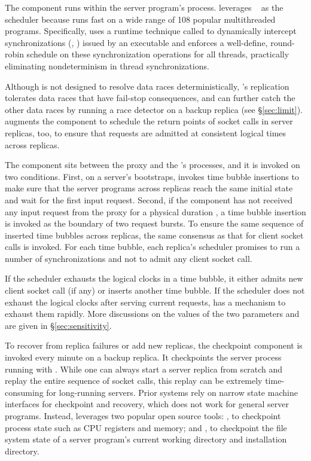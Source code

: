 The \dmt component runs within the server program's process. \xxx leverages 
\parrot~\cite{parrot:sosp13} as the \dmt scheduler because \parrot 
runs fast on a wide range of 108 popular multithreaded programs. Specifically, 
\parrot uses a runtime technique called \ldpreload to dynamically intercept 
\pthread synchronizations (\eg, \mutexlock) issued by an executable and 
enforces a well-define, round-robin schedule on these synchronization 
operations for all threads, practically eliminating nondeterminism in thread 
synchronizations.

Although \parrot is not designed to resolve data races
deterministically, \xxx's replication tolerates data races that have
fail-stop consequences, and can further catch the
other data races by running a race detector on a backup replica (see
\S\ref{sec:limit}).  \xxx augments the \dmt component to schedule the
return points of socket calls in server replicas, too, to ensure that
requests are admitted at consistent logical times across replicas.

The \timealgo component sits between the proxy and the \dmt's processes, and it 
is invoked on two conditions. First, on a server's bootstraps, \xxx invokes 
time bubble insertions to make sure that the server programs across replicas 
reach the same initial state and wait for the first input request. Second, if 
the \dmt component has not received any input request from the proxy for a 
physical duration \ntimeout, a time bubble insertion is invoked as the boundary 
of two request bursts. To ensure the same sequence of inserted time bubbles 
across replicas, the same \paxos consensus as that for client socket calls is 
invoked. For each time bubble, each replica's \dmt scheduler promises to run a 
number of \nclock synchronizations and not to admit any 
client socket call.

If the \dmt scheduler exhausts the logical clocks in a time bubble, it either 
admits new client socket call (if any) or inserts another time bubble. If the 
scheduler does not exhaust the logical clocks after serving current requests, 
\parrot has a mechanism to exhaust them rapidly. More discussions on the values 
of the two parameters \ntimeout and \nclock are given in 
\S\ref{sec:sensitivity}.



To recover from replica failures or add new replicas, the checkpoint 
component is invoked every minute on a backup replica. It
checkpoints the server process running with \dmt.  While one can always start a 
server replica from scratch and replay the entire sequence of socket calls, 
this replay can be extremely time-consuming for long-running servers.  Prior 
\smr systems rely on narrow state machine interfaces for checkpoint and
recovery, which does not work for general server programs. Instead, \xxx
leverages two popular open source tools: \criu, to checkpoint process 
state such as CPU registers and memory; and \lxc, to checkpoint the file 
system state of a server program's current working directory and installation 
directory.

